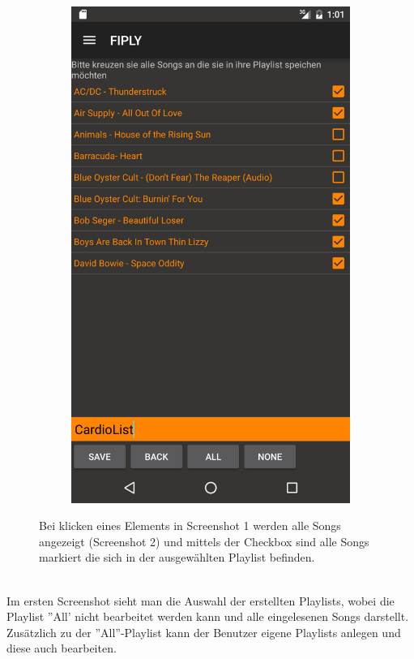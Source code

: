 \documentclass[FIPLY_base.tex]{subfiles}
\begin{document}
\begin{figure}[h]
\begin{subfigure}[b]{0.3\textwidth}
	\includegraphics[scale=0.15]{img/musicSongView1}
	\end{subfigure}
	\caption{Bei klicken eines Elements in Screenshot 1 werden alle Songs angezeigt (Screenshot 2) und mittels der Checkbox sind alle Songs markiert die sich in der ausgewählten Playlist befinden.}
\end{figure}

\ \\
Im ersten Screenshot sieht man die Auswahl der erstellten Playlists, wobei die Playlist ''All' nicht bearbeitet werden kann und alle eingelesenen Songs darstellt.
Zusätzlich zu der ''All''-Playlist kann der Benutzer eigene Playlists anlegen und diese auch bearbeiten.
\end{document}
